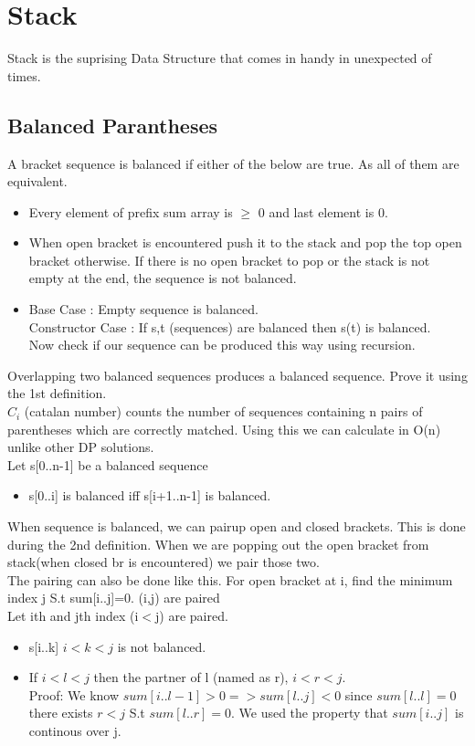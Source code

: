 \documentclass[main.tex]{subfiles}
\begin{document}
\chapter{Stack}
Stack is the suprising Data Structure that comes in handy in unexpected of times.

\section{Balanced Parantheses}
A bracket sequence is balanced if either of the below are true. As all of them are equivalent.

\begin{itemize}
  \item Every element of prefix sum array is $\geq$ 0 and last element is 0.
  \item When open bracket is encountered push it to the stack and pop the top open bracket otherwise. If there is no open bracket to pop or the stack is not empty at the end, the sequence is not balanced.
  \item Base Case : Empty sequence is balanced.\\
  Constructor Case : If s,t (sequences) are balanced then s(t) is balanced.\\
  Now check if our sequence can be produced this way using recursion. 
\end{itemize}

Overlapping two balanced sequences produces a balanced sequence. Prove it using the 1st definition. \\

$C_{i}$ (catalan number) counts the number of sequences containing n pairs of parentheses which are correctly matched. Using this we can calculate in O(n) unlike other DP solutions.\\

Let s[0..n-1] be a balanced sequence
\begin{itemize}
	\item s[0..i] is balanced iff s[i+1..n-1] is balanced.	
\end{itemize}

\pagebreak

When sequence is balanced, we can pairup open and closed brackets. This is done during the 2nd definition. When we are popping out the open bracket from stack(when closed br is encountered) we pair those two.\\

The pairing can also be done like this. For open bracket at i, find the minimum index j S.t sum[i..j]=0. (i,j) are paired\\

Let ith and jth index (i$<$j) are paired.
\begin{itemize}
	\item s[i..k] $i<k<j$ is not balanced.
	\item If $i<l<j$ then the partner of l (named as r), $i<r<j$. \\
	Proof: We know $sum[i..l-1]>0 => sum[l..j]<0$ since $sum[l..l] = 0$ there exists $r<j$ S.t $sum[l..r]=0$. We used the property that $sum[i..j]$ is continous over j.
\end{itemize} 
\end{document}
